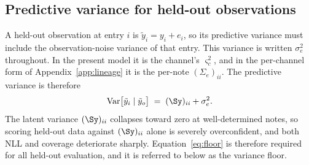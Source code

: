 
\subsection{Predictive variance for held-out observations}
A held-out observation at entry $i$ is $\tilde y_i = y_i + e_i$, so its
predictive variance must include the observation-noise variance of that
entry. This variance is written $\sigma_e^2$ throughout. In the present
model it is the channel's $\varsigma_c^2$, and in the per-channel form of
Appendix~\ref{app:lineage} it is the per-note $(\Sigma_e)_{ii}$. The
predictive variance is therefore
\begin{equation}
  \operatorname{Var}\bigl[\tilde y_i \mid \tilde y_{o}\bigr]
  \;=\; (\Sy)_{ii} + \sigma_e^2 .
  \label{eq:floor}
\end{equation}
The latent variance $(\Sy)_{ii}$ collapses toward zero at well-determined
notes, so scoring held-out data against $(\Sy)_{ii}$ alone is severely
overconfident, and both NLL and coverage deteriorate sharply.
Equation~\eqref{eq:floor} is therefore required for all held-out
evaluation, and it is referred to below as the variance floor.

